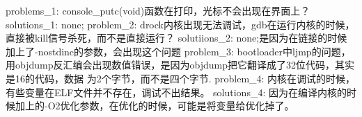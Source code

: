 problems_1:
	console_putc(void)函数在打印，光标不会出现在界面上？
solutions_1:
	none;
problem_2:
	drock内核出现无法调试，gdb在运行内核的时候，直接被kill信号杀死，而不是直接运行？
solutiions_2:
	none;是因为在链接的时候加上了-nostdinc的参数，会出现这个问题
problem_3:
	bootloader中ljmp的问题，用objdump反汇编会出现数值错误，是因为objdump把它翻译成了32位代码，其实是16的代码，数据
为2个字节，而不是四个字节.
problem_4:
	内核在调试的时候，有些变量在ELF文件并不存在，调试不出结果。
solutions_4:
	因为在编译内核的时候加上的-O2优化参数，在优化的时候，可能是将变量给优化掉了。
